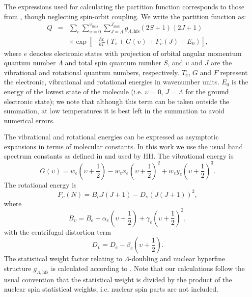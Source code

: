 \documentclass[traditabstract]{aa} %
\begin{document}
The expressions used for calculating the partition function corresponds to those from \cite[eqns. 26--31]{1987A&A...182..348I}, though neglecting spin-orbit coupling. We write the partition function as:
\begin{eqnarray}
Q & = & 
\sum_e \sum_{\upsilon=0}^{\upsilon_\mathrm{max}} \sum_{J=\Lambda}^{J_\mathrm{max}} g_{\Lambda, \mathrm{hfs}} (2S+1) (2J+1) \nonumber \\
&& \times \exp \left[ - \frac{hc}{kT} \left( T_e + G(\upsilon) + F_\upsilon(J) - E_0 \right) \right],
\label{eqn:1}
\end{eqnarray}
where $e$ denotes electronic states with projection of orbital angular momentum quantum number $\Lambda$ and total spin quantum number $S$, and $\upsilon$ and $J$ are the vibrational and rotational quantum numbers, respectively.  $T_e$, $G$ and $F$ represent the electronic, vibrational and rotational energies in wavenumber units.  $E_0$ is the energy of the lowest state of the molecule (i.e. $\upsilon = 0$, $J=\Lambda$ for the ground electronic state); we note that although this term can be taken outside the summation, at low temperatures it is best left in the summation to avoid numerical errors.  



The vibrational and rotational energies can be expressed as asymptotic expansions in terms of molecular constants.  In this work we use the usual band spectrum constants as defined in \cite{1950msms.book.....H} and used by HH.  The vibrational energy is
\begin{equation}
G(\upsilon) = w_e(\upsilon+\frac{1}{2}) - w_e x_e (\upsilon+\frac{1}{2})^2 + w_e y_e (\upsilon +\frac{1}{2})^3.
\label{eqn:2}
\end{equation}
The rotational energy is
\begin{equation}
F_\upsilon(N) = B_\upsilon J(J+1) - D_\upsilon (J(J+1))^2,
\label{eqn:3}
\end{equation}
where
\begin{equation}
B_\upsilon = B_e - \alpha_e (\upsilon+\frac{1}{2}) + \gamma_e (\upsilon+\frac{1}{2})^2,\end{equation}
with the centrifugal distortion term
\begin{equation}
D_\upsilon = D_e - \beta_e (\upsilon+\frac{1}{2}).
\end{equation}
The statistical weight factor relating to $\Lambda$-doubling and nuclear hyperfine structure $g_{\Lambda, \mathrm{hfs}}$ is calculated according to \citet[][Table~3 and eqns.~28 and~29]{1987A&A...182..348I}.  Note that our calculations follow the usual convention that the statistical weight is divided by the product of the nuclear spin statistical weights, i.e. nuclear spin parts are not included.
\end{document}
